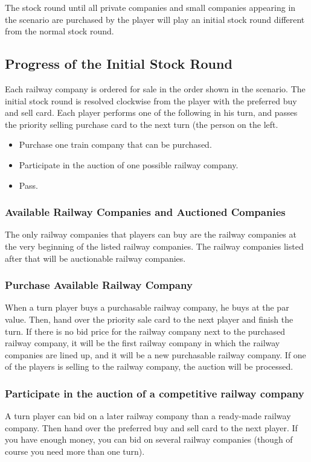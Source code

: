 \documentclass{article}
\begin{document}
\begin{CJK}{UTF8}{min}
The stock round until all private companies and small companies
appearing in the scenario are purchased by the player will play an
initial stock round different from the normal stock round.

\subsection{Progress of the Initial Stock Round}
Each railway company is ordered for sale in the order shown in the
scenario. The initial stock round is resolved clockwise from the
player with the preferred buy and sell card. Each player performs one
of the following in his turn, and passes the priority selling purchase
card to the next turn (the person on the left.

\begin{itemize}

\item Purchase one train company that can be purchased.
\item Participate in the auction of one possible railway company.
\item Pass.
\end{itemize}

\subsubsection{Available Railway Companies and Auctioned Companies}
The only railway companies that players can buy are the railway
companies at the very beginning of the listed railway companies. The
railway companies listed after that will be auctionable railway
companies.

\subsubsection{Purchase Available Railway Company}
When a turn player buys a purchasable railway company, he buys at the
par value. Then, hand over the priority sale card to the next player
and finish the turn. If there is no bid price for the railway company
next to the purchased railway company, it will be the first railway
company in which the railway companies are lined up, and it will be a
new purchasable railway company. If one of the players is selling to
the railway company, the auction will be processed.

\subsubsection{Participate in the auction of a competitive railway company}
A turn player can bid on a later railway company than a ready-made
railway company. Then hand over the preferred buy and sell card to the
next player. If you have enough money, you can bid on several railway
companies (though of course you need more than one turn).


\end{CJK}
\end{document}
